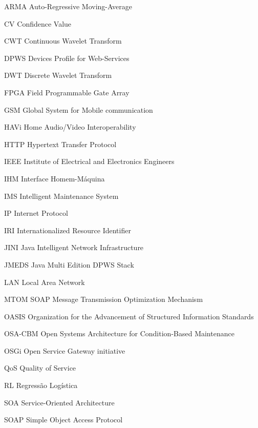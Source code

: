  {ARMA}
  {Auto-Regressive Moving-Average}

  {CV}
  {Confidence Value}

  {CWT}
  {Continuous Wavelet Transform}

  {DPWS}
  {Devices Profile for Web-Services}

  {DWT}
  {Discrete Wavelet Transform}

  {FPGA}
  {Field Programmable Gate Array}

  {GSM}
  {Global System for Mobile communication}

  {HAVi}
  {Home Audio/Video Interoperability}

  {HTTP}
  {Hypertext Transfer Protocol}

  {IEEE}
  {Institute of Electrical and Electronics Engineers}

  {IHM}
  {Interface Homem-Máquina}

  {IMS}
  {Intelligent Maintenance System}

  {IP}
  {Internet Protocol}

  {IRI}
  {Internationalized Resource Identifier}

  {JINI}
  {Java Intelligent Network Infrastructure}

  {JMEDS}
  {Java Multi Edition DPWS Stack}

  {LAN}
  {Local Area Network}

  {MTOM}
  {SOAP Message Transmission Optimization Mechanism}

  {OASIS}
  {Organization for the Advancement of Structured Information Standards}

  {OSA-CBM}
  {Open Systems Architecture for Condition-Based Maintenance}

  {OSGi}
  {Open Service Gateway initiative}

  {QoS}
  {Quality of Service}

  {RL}
  {Regressão Logística}

  {SOA}
  {Service-Oriented Architecture}

  {SOAP}
  {Simple Object Access Protocol}

